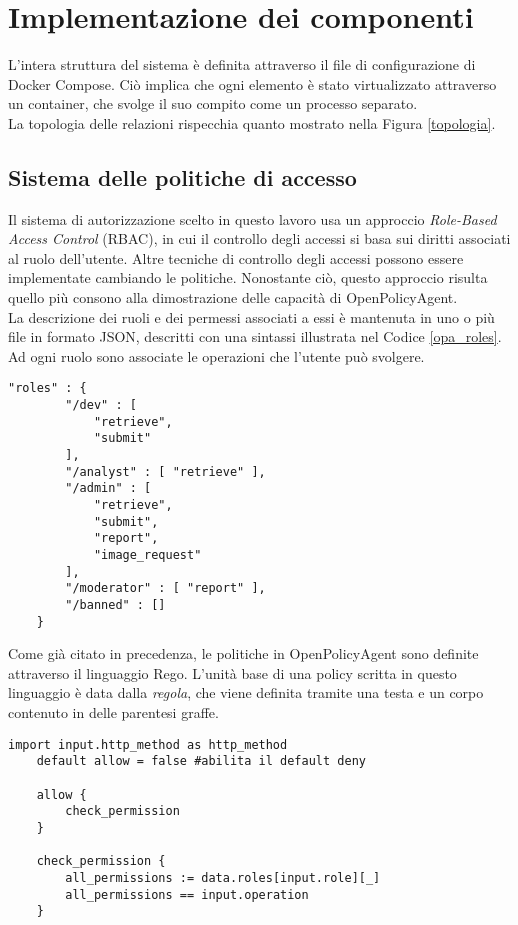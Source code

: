 \section{Implementazione dei componenti}
L'intera struttura del sistema è definita attraverso il file di configurazione di Docker Compose. Ciò implica che ogni 
elemento è stato virtualizzato attraverso un container, che svolge il suo compito come un processo separato. 
\\ La topologia delle relazioni rispecchia quanto mostrato nella Figura \ref*{topologia}. 


\subsection{Sistema delle politiche di accesso}
Il sistema di autorizzazione scelto in questo lavoro usa un approccio \textit{Role-Based Access Control} (RBAC), in cui il 
controllo degli accessi si basa sui diritti associati al ruolo dell'utente. 
Altre tecniche di controllo degli accessi possono essere implementate cambiando le politiche. Nonostante ciò, 
questo approccio risulta quello più consono alla dimostrazione delle capacità di OpenPolicyAgent.
\\ La descrizione dei ruoli e dei permessi associati a essi è mantenuta in uno o più file in formato JSON, descritti con una sintassi illustrata nel Codice \ref*{opa_roles}.
Ad ogni ruolo sono associate le operazioni che l'utente può svolgere.
\lstset{language=nginx}
\begin{lstlisting}[caption={[Descrizione dei ruoli in JSON]Descrizione dei ruoli e dei loro relativi permessi in formato JSON.},captionpos=b,label=opa_roles]
    "roles" : {
        "/dev" : [
            "retrieve", 
            "submit"
        ],
        "/analyst" : [ "retrieve" ],
        "/admin" : [ 
            "retrieve", 
            "submit",
            "report",
            "image_request"
        ],
        "/moderator" : [ "report" ], 
        "/banned" : []
    }
\end{lstlisting}
Come già citato in precedenza, le politiche in OpenPolicyAgent sono definite attraverso il linguaggio Rego. L'unità base di una policy scritta in questo linguaggio è data 
dalla \textit{regola}, che viene definita tramite una testa e un corpo contenuto in delle parentesi graffe. 
\begin{lstlisting}[caption={[Policy in linguaggio Rego]Policy in linguaggio Rego. L'operatore ``:='' indica un assegnamento di valore, mentre ``=='' permette di confrontare l'uguaglianza fra i valori delle due variabili. L'indice ``\_'' permette di considerare tutti i valori di una dimensione di un vettore.},captionpos=b,label=opa_policy]
    import input.http_method as http_method   
    default allow = false #abilita il default deny

    allow {
        check_permission
    }

    check_permission {
        all_permissions := data.roles[input.role][_]
        all_permissions == input.operation
    }
\end{lstlisting}

